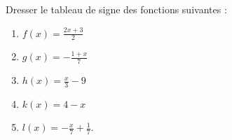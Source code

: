 
\begin{exercice}\label{exosmath-0504}

    Dresser le tableau de signe des fonctions suivantes :
    \begin{multicols}{2}
        \begin{enumerate}
            \item
                \( f(x)=\frac{ 2x+3 }{ 2 }\)
            \item
                \( g(x)=-\frac{ 1+x }{ 7 }\)
            \item
                \( h(x)=\frac{ x }{ 3 }-9\)
            \item
                \( k(x)=4-x\)
            \item
                \( l(x)=-\frac{ x }{ 7 }+\frac{1}{ 7 }\).
        \end{enumerate}
    \end{multicols}

\end{exercice}

